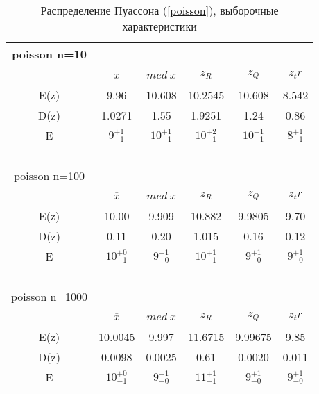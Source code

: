 \documentclass[12pt,a4paper]{article}
\begin{document}
			\begin{table}[h!]
				\label{tabular:poisson}
				\begin{center}
					\begin{tabular}{|c|c|c|c|c|c|} 
						
						\hline
						poisson n=10 & \ & \ & \ & \ & \ \\ \hline
						\ & $\overline{x}$ & $med \ x$ & $z_R$ & $z_Q$ & $z_tr$ \\ \hline
						E(z) & 9.96 & 10.608 & 10.2545 & 10.608 & 8.542 \\ \hline
						D(z) & 1.0271  & 1.55 & 1.9251 &  1.24  &  0.86 \\ \hline
						E & $9^{+1}_{-1}$ & $10^{+1}_{-1}$ & $10^{+2}_{-1}$ & $10^{+1}_{-1}$ & $8^{+1}_{-1}$\\\hline
						\ & \ & \ & \ & \ & \ \\ \hline
						
						poisson n=100 & \ & \ & \ & \ & \ \\ \hline
						\ & $\overline{x}$ & $med \ x$  & $z_R$  & $z_Q$  & $z_tr$ \\ \hline
						E(z) & 10.00 & 9.909 &  10.882 & 9.9805 & 9.70 \\ \hline
						D(z) & 0.11   & 0.20 & 1.015 &  0.16 & 0.12 \\ \hline
						E & $10^{+0}_{-1}$ & $9^{+1}_{-0}$ & $10^{+1}_{-1}$ & $9^{+1}_{-0}$ & $9^{+1}_{-0}$\\\hline
						\ & \ & \ & \ & \ & \ \\ \hline
						
						poisson n=1000 & \ & \ & \ & \ & \ \\ \hline
						\ & $\overline{x}$ & $med \ x$  & $z_R$  & $z_Q$  & $z_tr$ \\ \hline
						E(z) & 10.0045 & 9.997 &  11.6715 & 9.99675 & 9.85 \\ \hline
						D(z) & 0.0098   & 0.0025 & 0.61 &  0.0020  &  0.011 \\ \hline
						E & $10^{+0}_{-1}$ & $9^{+1}_{-0}$ & $11^{+1}_{-1}$ & $9^{+1}_{-0}$ & $9^{+1}_{-0}$ \\\hline
						
					\end{tabular}
				\end{center}
				\caption{Распределение Пуассона (\ref{poisson}), выборочные характеристики}
			\end{table}
			
\end{document}
